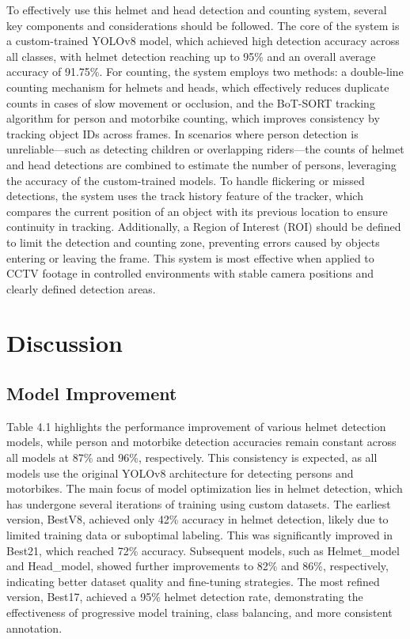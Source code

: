 To effectively use this helmet and head detection and counting system, several key components and considerations should be followed. The core of the system is a custom-trained YOLOv8 model, which achieved high detection accuracy across all classes, with helmet detection reaching up to 95\% and an overall average accuracy of 91.75\%. For counting, the system employs two methods: a double-line counting mechanism for helmets and heads, which effectively reduces duplicate counts in cases of slow movement or occlusion, and the BoT-SORT tracking algorithm for person and motorbike counting, which improves consistency by tracking object IDs across frames. In scenarios where person detection is unreliable—such as detecting children or overlapping riders—the counts of helmet and head detections are combined to estimate the number of persons, leveraging the accuracy of the custom-trained models. To handle flickering or missed detections, the system uses the track history feature of the tracker, which compares the current position of an object with its previous location to ensure continuity in tracking. Additionally, a Region of Interest (ROI) should be defined to limit the detection and counting zone, preventing errors caused by objects entering or leaving the frame. This system is most effective when applied to CCTV footage in controlled environments with stable camera positions and clearly defined detection areas.



\section{Discussion}
\subsection{Model Improvement}
\setlength{\parindent}{2.5em}
Table 4.1 highlights the performance improvement of various helmet detection models, while person and motorbike detection accuracies remain constant across all models at 87\% and 96\%, respectively. This consistency is expected, as all models use the original YOLOv8 architecture for detecting persons and motorbikes. The main focus of model optimization lies in helmet detection, which has undergone several iterations of training using custom datasets. The earliest version, BestV8, achieved only 42\% accuracy in helmet detection, likely due to limited training data or suboptimal labeling. This was significantly improved in Best21, which reached 72\% accuracy. Subsequent models, such as Helmet\_model and Head\_model, showed further improvements to 82\% and 86\%, respectively, indicating better dataset quality and fine-tuning strategies. The most refined version, Best17, achieved a 95\% helmet detection rate, demonstrating the effectiveness of progressive model training, class balancing, and more consistent annotation.
